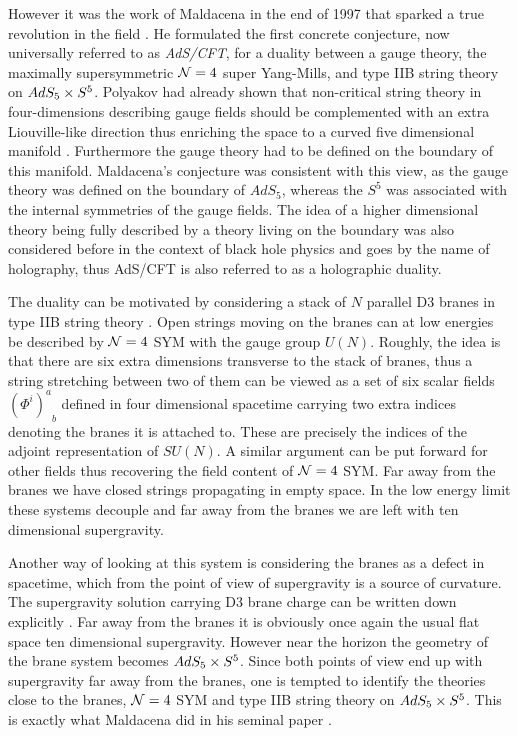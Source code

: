 However it was the work of Maldacena in the end of 1997 that sparked a true revolution in the field \cite{Maldacena:1997re}. 
He formulated the first concrete conjecture, now universally referred to as \emph{AdS/CFT}, for a duality between a gauge theory, the maximally supersymmetric $\mathcal{N}=4$ super Yang-Mills, and type IIB string theory on $AdS_5 \times S^5$. 
Polyakov had already shown that non-critical string theory in four-dimensions describing gauge fields should be complemented with an extra Liouville-like direction thus enriching the space to a curved five dimensional manifold \cite{Polyakov:1997tj}. Furthermore the gauge theory had to be defined on the boundary of this manifold.
Maldacena's conjecture was consistent with this view, as the gauge theory was defined on the boundary of $AdS_5$, whereas the $S^5$ was associated with the internal symmetries of the gauge fields.
The idea of a higher dimensional theory being fully described by a theory living on the boundary was also considered before in the context of black hole physics \cite{'tHooft:1993gx, Susskind:1994vu} and goes by the name of holography, thus AdS/CFT is also referred to as a holographic duality.

The duality can be motivated by considering a stack of $N$ parallel D3 branes in type IIB string theory \cite{Polchinski:1995mt}. 
Open strings moving on the branes can at low energies be described by $\mathcal{N}=4$ SYM with the gauge group $U(N)$. 
Roughly, the idea is that there are six extra dimensions transverse to the stack of branes, thus a string stretching between two of them can be viewed as a set of six scalar fields ${(\Phi^i)^a}_b$ defined in four dimensional spacetime carrying two extra indices denoting the branes it is attached to. 
These are precisely the indices of the adjoint representation of $SU(N)$.
A similar argument can be put forward for other fields thus recovering the field content of $\mathcal{N}=4$ SYM.
Far away from the branes we have closed strings propagating in empty space. 
In the low energy limit these systems decouple and far away from the branes we are left with ten dimensional supergravity.

Another way of looking at this system is considering the branes as a defect in spacetime, which from the point of view of supergravity is a source of curvature. 
The supergravity solution carrying D3 brane charge can be written down explicitly \cite{Horowitz:1991cd}.
Far away from the branes it is obviously once again the usual flat space ten dimensional supergravity.
However near the horizon the geometry of the brane system becomes $AdS_5 \times S^5$.
Since both points of view end up with supergravity far away from the branes, one is tempted to identify the theories close to the branes, $\mathcal{N}=4$ SYM and type IIB string theory on $AdS_5 \times S^5$. 
This is exactly what Maldacena did in his seminal paper \cite{Maldacena:1997re}. 


